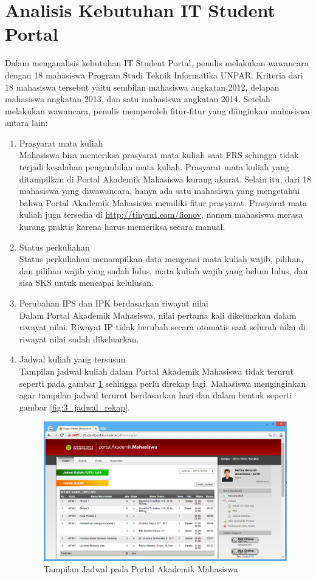 \section{Analisis Kebutuhan IT Student Portal}
Dalam menganalisis kebutuhan IT Student Portal, penulis melakukan wawancara dengan 18 mahasiswa Program Studi Teknik Informatika UNPAR. Kriteria dari 18 mahasiswa tersebut yaitu sembilan mahasiswa angkatan 2012, delapan mahasiswa angkatan 2013, dan satu mahasiswa angkatan 2014. Setelah melakukan wawancara, penulis memperoleh fitur-fitur yang diinginkan mahasiswa antara lain:
\begin{enumerate}
	\item Prasyarat mata kuliah\\
	Mahasiswa bisa memeriksa prasyarat mata kuliah saat FRS sehingga tidak terjadi kesalahan pengambilan mata kuliah. Prasyarat mata kuliah yang ditampilkan di Portal Akademik Mahasiswa kurang akurat. Selain itu, dari 18 mahasiswa yang diwawancara, hanya ada satu mahasiswa yang mengetahui bahwa Portal Akademik Mahasiswa memiliki fitur prasyarat. Prasyarat mata kuliah juga tersedia di \url{http://tinyurl.com/lionov}, namun mahasiswa merasa kurang praktis karena harus memeriksa secara manual.
	\item Status perkuliahan\\
	Status perkuliahan menampilkan data mengenai mata kuliah wajib, pilihan, dan pilihan wajib yang sudah lulus, mata kuliah wajib yang belum lulus, dan sisa SKS untuk mencapai kelulusan.
	\item Perubahan IPS dan IPK berdasarkan riwayat nilai\\
	Dalam Portal Akademik Mahasiswa, nilai pertama kali dikeluarkan dalam riwayat nilai. Riwayat IP tidak berubah secara otomatis saat seluruh nilai di riwayat nilai sudah dikeluarkan.
	\item Jadwal kuliah yang tersusun\\
	Tampilan jadwal kuliah dalam Portal Akademik Mahasiswa tidak terurut seperti pada gambar \ref{fig:3_jadwal_portal} sehingga perlu direkap lagi. Mahasiswa menginginkan agar tampilan jadwal terurut berdasarkan hari dan dalam bentuk seperti gambar \ref{fig:3_jadwal_rekap}.
		\begin{figure}[H]
			\centering
			\includegraphics[scale=0.5]{Gambar/jadwal-portal}
			\caption{Tampilan Jadwal pada Portal Akademik Mahasiswa} 
			\label{fig:3_jadwal_portal}
		\end{figure}
		

\end{enumerate}
